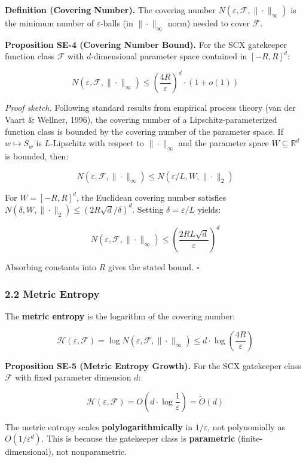 \documentclass[
  12pt,
]{ctexart}
\begin{document}
\textbf{Definition (Covering Number).} The covering number
\(N(\varepsilon, \mathcal{F}, \|\cdot\|_{\infty})\) is the minimum
number of \(\varepsilon\)-balls (in \(\|\cdot\|_{\infty}\) norm) needed
to cover \(\mathcal{F}\).

\textbf{Proposition SE-4 (Covering Number Bound).} For the SCX
gatekeeper function class \(\mathcal{F}\) with \(d\)-dimensional
parameter space contained in \([-R, R]^d\):

\[N(\varepsilon, \mathcal{F}, \|\cdot\|_{\infty}) \leq \left( \frac{4R}{\varepsilon} \right)^d \cdot (1 + o(1))\]

\emph{Proof sketch.} Following standard results from empirical process
theory (van der Vaart \& Wellner, 1996), the covering number of a
Lipschitz-parameterized function class is bounded by the covering number
of the parameter space. If \(w \mapsto S_w\) is \(L\)-Lipschitz with
respect to \(\|\cdot\|_{\infty}\) and the parameter space
\(W \subseteq \mathbb{R}^d\) is bounded, then:

\[N(\varepsilon, \mathcal{F}, \|\cdot\|_{\infty}) \leq N(\varepsilon/L, W, \|\cdot\|_2)\]

For \(W = [-R, R]^d\), the Euclidean covering number satisfies
\(N(\delta, W, \|\cdot\|_2) \leq (2R\sqrt{d}/\delta)^d\). Setting
\(\delta = \varepsilon/L\) yields:

\[N(\varepsilon, \mathcal{F}, \|\cdot\|_{\infty}) \leq \left( \frac{2RL\sqrt{d}}{\varepsilon} \right)^d\]

Absorbing constants into \(R\) gives the stated bound. \(\square\)

\subsubsection{2.2 Metric Entropy}\label{metric-entropy}

The \textbf{metric entropy} is the logarithm of the covering number:

\[\mathcal{H}(\varepsilon, \mathcal{F}) = \log N(\varepsilon, \mathcal{F}, \|\cdot\|_{\infty}) \leq d \cdot \log\left( \frac{4R}{\varepsilon} \right)\]

\textbf{Proposition SE-5 (Metric Entropy Growth).} For the SCX
gatekeeper class \(\mathcal{F}\) with fixed parameter dimension \(d\):

\[\mathcal{H}(\varepsilon, \mathcal{F}) = O\left( d \cdot \log\frac{1}{\varepsilon} \right) = \tilde{O}(d)\]

The metric entropy scales \textbf{polylogarithmically} in
\(1/\varepsilon\), not polynomially as \(O(1/\varepsilon^d)\). This is
because the gatekeeper class is \textbf{parametric}
(finite-dimensional), not nonparametric.
\end{document}
